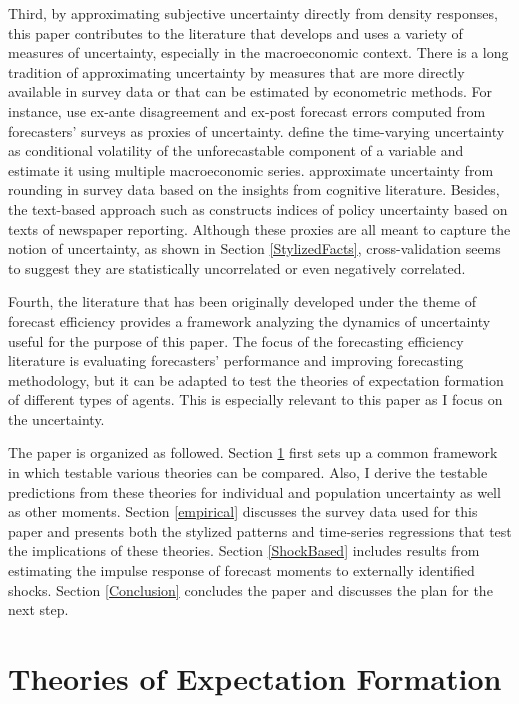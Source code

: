 \documentclass[12pt]{article}
\begin{document}
	Third, by approximating subjective uncertainty directly from density responses, this paper contributes to the literature that develops and uses a variety of measures of uncertainty, especially in the macroeconomic context. There is a long tradition of approximating uncertainty by measures that are more directly available in survey data or that can be estimated by econometric methods. For instance, \citet{bachmann2013uncertainty} use ex-ante disagreement and ex-post forecast errors computed from forecasters' surveys as proxies of uncertainty. \citet{jurado2015measuring} define the time-varying uncertainty as conditional volatility of the unforecastable component of a variable and estimate it using multiple macroeconomic series. \citet{binder2017measuring} approximate uncertainty from rounding in survey data based on the insights from cognitive literature. Besides, the text-based approach such as \citet{bloom2009impact} constructs indices of policy uncertainty based on texts of newspaper reporting. Although these proxies are all meant to capture the notion of uncertainty,  as shown in Section \ref{StylizedFacts}, cross-validation seems to suggest they are statistically uncorrelated or even negatively correlated. 
	 	
	Fourth, the literature that has been originally developed under the theme of forecast efficiency provides a framework analyzing the dynamics of uncertainty useful for the purpose of this paper. The focus of the forecasting efficiency literature is evaluating forecasters' performance and improving forecasting methodology, but it can be adapted to test the theories of expectation formation of different types of agents. This is especially relevant to this paper as I focus on the uncertainty. 
	
	The paper is organized as followed. Section \ref{theory} first sets up a common framework in which testable various theories can be compared. Also, I derive the testable predictions from these theories for individual and population uncertainty as well as other moments. Section \ref{empirical} discusses the survey data used for this paper and presents both the stylized patterns and time-series regressions that test the implications of these theories.   Section \ref{ShockBased} includes results from estimating the impulse response of forecast moments to externally identified shocks.  Section \ref{Conclusion} concludes the paper and discusses the plan for the next step. 
	
	\section{Theories of Expectation Formation}\label{theory}
	
\end{document}
